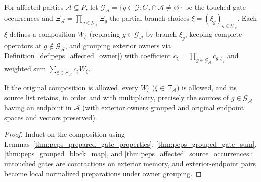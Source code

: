\begin{definition}
    \label{def:peps_partial_source_choices}
    \leanok
    For affected parties $\mathcal A\subseteq P$, let
    $\mathcal G_{\mathcal A}=\{g\in\mathcal G:C_g\cap\mathcal A\neq\varnothing\}$
    be the touched gate occurrences and
    $\Xi_{\mathcal A}=\prod_{g\in\mathcal G_{\mathcal A}}\Xi_g$ the partial
    branch choices $\xi=(\xi_g)_{g\in\mathcal G_{\mathcal A}}$. Each $\xi$
    defines a composition $W_\xi$ (replacing $g\in\mathcal G_{\mathcal A}$ by
    branch $\xi_g$, keeping complete operators at $g\notin\mathcal G_{\mathcal A}$,
    and grouping exterior owners via Definition~\ref{def:peps_affected_owner})
    with coefficient $c_\xi=\prod_{g\in\mathcal G_{\mathcal A}}c_{g,\xi_g}$ and
    weighted sum $\sum_{\xi\in\Xi_{\mathcal A}}c_\xi W_\xi$.
\end{definition}

\begin{lemma}
    \label{thm:peps_partial_source_inventory}
    \leanok
    If the original composition is allowed, every $W_\xi$ ($\xi\in\Xi_{\mathcal A}$)
    is allowed, and its source list retains, in order and with multiplicity,
    precisely the sources of $g\in\mathcal G_{\mathcal A}$ having an endpoint in
    $\mathcal A$ (with exterior owners grouped and original endpoint spaces and
    vectors preserved).
\end{lemma}

\begin{proof}
    \leanok
    Induct on the composition using Lemmas~\ref{thm:peps_prepared_gate_properties},
    \ref{thm:peps_grouped_gate_sum}, \ref{thm:peps_grouped_block_map}, and
    \ref{thm:peps_affected_source_occurrences}: untouched gates are contractions
    on exterior memory, and exterior-endpoint pairs become local normalized
    preparations under owner grouping.
\end{proof}

